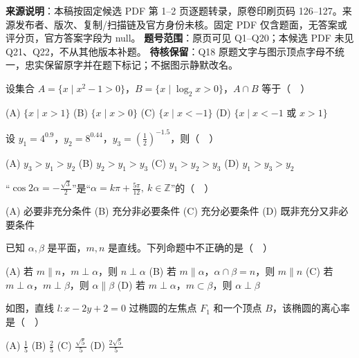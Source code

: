 

\begin{gktip}
\textbf{来源说明}：本稿按固定候选 PDF 第 1–2 页逐题转录，原卷印刷页码 126–127。来源发布者、版次、复制/扫描链及官方身份未核。固定 PDF 仅含题面，无答案或评分页，官方答案字段为 null。
\textbf{题号范围}：原页可见 Q1–Q20；本候选 PDF 未见 Q21、Q22，不从其他版本补题。
\textbf{待核保留}：Q18 原题文字与图示顶点字母不统一，忠实保留原字并在题下标记；不据图示静默改名。
\end{gktip}


\begin{question}
设集合 \(A=\{x\mid x^2-1>0\}\)，\(B=\{x\mid \log_2x>0\}\)，\(A\cap B\) 等于（　）

    (A) \(\{x\mid x>1\}\)
    (B) \(\{x\mid x>0\}\)
    (C) \(\{x\mid x<-1\}\)
    (D) \(\{x\mid x<-1\text{ 或 }x>1\}\)

\end{question}
\begin{question}
设 \(y_1=4^{0.9}\)，\(y_2=8^{0.44}\)，\(y_3=\left(\frac12\right)^{-1.5}\)，则（　）

    (A) \(y_3>y_1>y_2\)
    (B) \(y_2>y_1>y_3\)
    (C) \(y_1>y_2>y_3\)
    (D) \(y_1>y_3>y_2\)

\end{question}
\begin{question}
“\(\cos 2\alpha=-\frac{\sqrt3}{2}\)”是“\(\alpha=k\pi+\frac{5\pi}{12},\ k\in\mathbb Z\)”的（　）

    (A) 必要非充分条件
    (B) 充分非必要条件
    (C) 充分必要条件
    (D) 既非充分又非必要条件

\end{question}
\begin{question}
已知 \(\alpha,\beta\) 是平面，\(m,n\) 是直线。下列命题中不正确的是（　）

    (A) 若 \(m\parallel n\)，\(m\perp\alpha\)，则 \(n\perp\alpha\)
    (B) 若 \(m\parallel\alpha\)，\(\alpha\cap\beta=n\)，则 \(m\parallel n\)
    (C) 若 \(m\perp\alpha\)，\(m\perp\beta\)，则 \(\alpha\parallel\beta\)
    (D) 若 \(m\perp\alpha\)，\(m\subset\beta\)，则 \(\alpha\perp\beta\)

\Needspace{0.4\textheight}
\end{question}
\begin{question}
如图，直线 \(l:x-2y+2=0\) 过椭圆的左焦点 \(F_1\) 和一个顶点 \(B\)，该椭圆的离心率是（　）

    (A) \(\frac15\)
    (B) \(\frac25\)
    (C) \(\frac{\sqrt5}{5}\)
    (D) \(\frac{2\sqrt5}{5}\)
\nopagebreak[4]
\begin{center}\end{center}
\nopagebreak[4]
\end{question}

